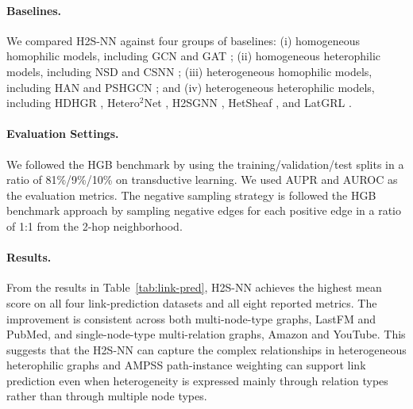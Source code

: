 \documentclass[sigconf,anonymous,review]{acmart}
\newcommand{\method}{\textsc{H2S-NN}}
\newcommand{\ampss}{\textsc{AMPSS}}
\begin{document}
\paragraph{Baselines.} We compared \method{} against four groups of baselines: (i) homogeneous homophilic models, including GCN \cite{kipf2017gcn} and GAT \cite{velickovic2018gat}; (ii) homogeneous heterophilic models, including NSD \cite{bodnar2022neural} and CSNN \cite{ribeiro2026cooperative}; (iii) heterogeneous homophilic models, including HAN \cite{wang2019han} and PSHGCN \cite{he2024spectral}; and (iv) heterogeneous heterophilic models, including HDHGR \cite{guo2023homophily}, Hetero$^2$Net \cite{li2025hetero2net}, H2SGNN \cite{lu2026addressing}, HetSheaf \cite{braithwaite2024heterogeneous}, and LatGRL \cite{shen2025heterophily}.

\paragraph{Evaluation Settings.} We followed the HGB benchmark \cite{lv2021hgb} by using the training/validation/test splits in a ratio of 81\%/9\%/10\% on transductive learning. We used AUPR and AUROC as the evaluation metrics. The negative sampling strategy is followed the HGB benchmark approach \cite{lv2021hgb} by sampling negative edges for each positive edge in a ratio of 1:1 from the 2-hop neighborhood. 

\paragraph{Results.} From the results in Table~\ref{tab:link-pred}, \method{} achieves the highest mean score on all four link-prediction datasets and all eight reported metrics. The improvement is consistent across both multi-node-type graphs, LastFM and PubMed, and single-node-type multi-relation graphs, Amazon and YouTube. This suggests that the \method{} can capture the complex relationships in heterogeneous heterophilic graphs and \ampss{} path-instance weighting can support link prediction even when heterogeneity is expressed mainly through relation types rather than through multiple node types.
\end{document}
